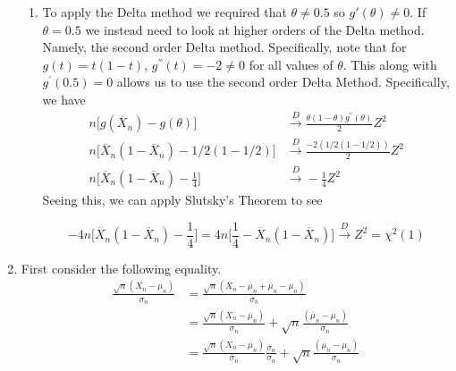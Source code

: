 \documentclass[12pt]{article}  %
\begin{document}
\begin{enumerate}
\begin{enumerate}
\item To apply the Delta method we required that $\theta\neq 0.5$ so $g{'}(\theta)\neq 0$. If $\theta = 0.5$ we instead need to look at higher orders of the Delta method. Namely, the second order Delta method. Specifically, note that for $g(t) = t(1-t)$, $g^{''}(t) = -2\neq0$ for all values of $\theta$. This along with $g^{'}(0.5)  = 0$ allows us to use the second order Delta Method. Specifically, we have 
\begin{align*}
n\big[g(\overline{X}_n) - g(\theta)\big]&\overset{D}{\longrightarrow} \frac{\theta(1-\theta)g^{''}(\theta)}{2}Z^2\\
n\big[\overline{X}_n(1-\overline{X}_n) - 1/2(1-1/2)\big]&\overset{D}{\longrightarrow} \frac{-2(1/2(1-1/2))}{2}Z^2\\
n\big[\overline{X}_n(1-\overline{X}_n) - \frac{1}{4}\big]&\overset{D}{\longrightarrow} -\frac{1}{4}Z^2
\end{align*}
Seeing this, we can apply Slutsky's Theorem to see 

$$-4n\big[\overline{X}_n(1-\overline{X}_n) - \frac{1}{4}\big] = 4n\big[\frac{1}{4}-\overline{X}_n(1-\overline{X}_n)\big]\overset{D}{\longrightarrow}Z^2 = \chi^2(1)$$
\end{enumerate}

\item First consider the following equality. \begin{align*}
\frac{\sqrt{n}(\overline{X}_n - \mu_n)}{\sigma_n} &= \frac{\sqrt{n}(\overline{X}_n - \overline{\mu}_n+\overline{\mu}_n-\mu_n)}{\sigma_n}\\
& = \frac{\sqrt{n}(X_n - \overline{\mu}_n)}{\sigma_n} + \sqrt{n}\frac{(\overline{\mu}_n - \mu_n)}{\sigma_n}\\
& = \frac{\sqrt{n}(X_n - \overline{\mu}_n)}{\overline{\sigma}_n}\frac{\overline{\sigma}_n}{\sigma_n} + \sqrt{n}\frac{(\overline{\mu}_n - \mu_n)	}{\sigma_n}
\end{align*} 


\end{enumerate}
\end{document}
